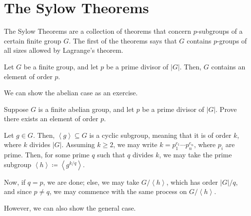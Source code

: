 \documentclass[10pt]{mypackage}
\begin{document}
\section{The Sylow Theorems}%
The Sylow Theorems are a collection of theorems that concern $p$-subgroups of a certain finite group $G$. The first of the theorems says that $G$ contains $p$-groups of all sizes allowed by Lagrange's theorem.
\begin{theorem}
  Let $G$ be a finite group, and let $p$ be a prime divisor of $\left\vert G \right\vert$. Then, $G$ contains an element of order $p$.
\end{theorem}
We can show the abelian case as an exercise.
\begin{exercise}
  Suppose $G$ is a finite abelian group, and let $p$ be a prime divisor of $\left\vert G \right\vert$. Prove there exists an element of order $p$.
\end{exercise}
\begin{solution}
  Let $g\in G$. Then, $\left\langle g \right\rangle\subseteq G$ is a cyclic subgroup, meaning that it is of order $k$, where $k$ divides $\left\vert G \right\vert$. Assuming $k\geq 2$, we may write $k = p_1^{e_1}\cdots p_n^{e_n}$, where $p_i$ are prime. Then, for some prime $q $ such that $q$ divides $ k$, we may take the prime subgroup $\left\langle h \right\rangle \coloneq \left\langle g^{k/q} \right\rangle$.\newline

  Now, if $q = p$, we are done; else, we may take $G/\left\langle h \right\rangle$, which has order $\left\vert G \right\vert/q$, and since $p\neq q$, we may commence with the same process on $G/\left\langle h \right\rangle$.
\end{solution}
However, we can also show the general case.
\end{document}
